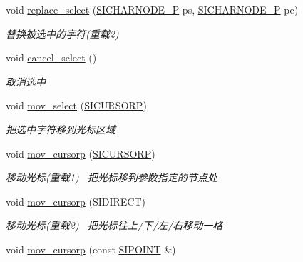 \begin{DoxyCompactItemize}
\mbox{\label{class_s_i_t_e_x_t_ac2480043349d0c611a717c87ffbc6415}} 
void \hyperlink{class_s_i_t_e_x_t_ac2480043349d0c611a717c87ffbc6415}{replace\+\_\+select} (\hyperlink{class_s_i_c_h_a_r_n_o_d_e}{S\+I\+C\+H\+A\+R\+N\+O\+D\+E\+\_\+P} ps, \hyperlink{class_s_i_c_h_a_r_n_o_d_e}{S\+I\+C\+H\+A\+R\+N\+O\+D\+E\+\_\+P} pe)
\begin{DoxyCompactList}\small\item\em 替换被选中的字符(重载2) \end{DoxyCompactList}\item 
void \hyperlink{class_s_i_t_e_x_t_a3a942ca324f4c37a4d747ba7a91a293b}{cancel\+\_\+select} ()
\begin{DoxyCompactList}\small\item\em 取消选中~\newline
\end{DoxyCompactList}\item 
\mbox{\label{class_s_i_t_e_x_t_abb0fb0438be292cc363813dece5b6258}} 
void \hyperlink{class_s_i_t_e_x_t_abb0fb0438be292cc363813dece5b6258}{mov\+\_\+select} (\hyperlink{class_s_i_c_h_a_r_n_o_d_e}{S\+I\+C\+U\+R\+S\+O\+RP})
\begin{DoxyCompactList}\small\item\em 把选中字符移到光标区域 \end{DoxyCompactList}\item 
void \hyperlink{class_s_i_t_e_x_t_a79c57242ea31d6792f319aaf5ac8d8f0}{mov\+\_\+cursorp} (\hyperlink{class_s_i_c_h_a_r_n_o_d_e}{S\+I\+C\+U\+R\+S\+O\+RP})
\begin{DoxyCompactList}\small\item\em 移动光标(重载1)~\newline
把光标移到参数指定的节点处 \end{DoxyCompactList}\item 
void \hyperlink{class_s_i_t_e_x_t_afdf96b3841922ef6436666b9e7bc884d}{mov\+\_\+cursorp} (S\+I\+D\+I\+R\+E\+CT)
\begin{DoxyCompactList}\small\item\em 移动光标(重载2)~\newline
把光标往上/下/左/右移动一格 \end{DoxyCompactList}\item 
void \hyperlink{class_s_i_t_e_x_t_a4542e94a4f3d3e4d47983bf051dc7ec4}{mov\+\_\+cursorp} (const \hyperlink{struct_s_i_p_o_i_n_t}{S\+I\+P\+O\+I\+NT} \&)
\item 

\end{DoxyCompactItemize}
